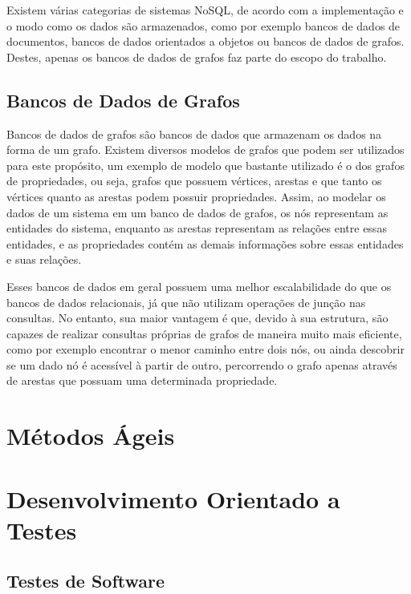 Existem várias categorias de sistemas NoSQL, de acordo com a implementação e o modo como os dados são armazenados, como por exemplo bancos de dados de documentos, bancos de dados orientados a objetos ou bancos de dados de grafos.
Destes, apenas os bancos de dados de grafos faz parte do escopo do trabalho.

\subsection{Bancos de Dados de Grafos}


Bancos de dados de grafos são bancos de dados que armazenam os dados na forma de um grafo. Existem diversos modelos de grafos que podem ser utilizados para este propósito, um exemplo de modelo que bastante utilizado é o dos grafos de propriedades, ou seja, grafos que possuem vértices, arestas e que tanto os vértices quanto as arestas podem possuir propriedades.
Assim, ao modelar os dados de um sistema em um banco de dados de grafos, os nós representam as entidades do sistema, enquanto as arestas representam as relações entre essas entidades, e as propriedades contém as demais informações sobre essas entidades e suas relações.


Esses bancos de dados em geral possuem uma melhor escalabilidade do que os bancos de dados relacionais, já que não utilizam operações de junção nas consultas.
No entanto, sua maior vantagem é que, devido à sua estrutura, são capazes de realizar consultas próprias de grafos de maneira muito mais eficiente, como por exemplo encontrar o menor caminho entre dois nós, ou ainda descobrir se um dado nó é acessível à partir de outro, percorrendo o grafo apenas através de arestas que possuam uma determinada propriedade.


\section{Métodos Ágeis}

\section{Desenvolvimento Orientado a Testes}

\subsection{Testes de Software}

